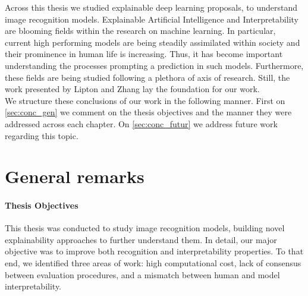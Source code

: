 \label{concs}
Across this thesis we studied explainable deep learning proposals, to understand image 
recognition models. Explainable Artificial Intelligence and Interpretability are blooming fields 
within the research on machine learning. In particular, current high performing models are 
being steadily assimilated within society and their prominence in human life is increasing. Thus, 
it has become important understanding the processes prompting a prediction in such models. 
Furthermore, these fields are being studied following a plethora of axis of research. Still, the 
work presented by Lipton \autocite{mythos_interp} and Zhang \autocite{zhang2021survey} lay the 
foundation for our work.\\

We structure these conclusions of our work in the following manner. First on \autoref{sec:conc_gen} 
we comment on the thesis objectives and the manner they were addressed across each chapter. On 
\autoref{sec:conc_futur} we address future work regarding this topic.\\

\section{General remarks}
\label{sec:conc_gen}

\paragraph{Thesis Objectives}
\label{sub:conc_obj}
This thesis was conducted to study image recognition models, building novel explainability 
approaches to further understand them. In detail, our major objective was to improve both 
recognition and interpretability properties. To that end, we identified three areas of  
work: high computational cost, lack of consensus between evaluation procedures, and a mismatch 
between human and model interpretability.\\

